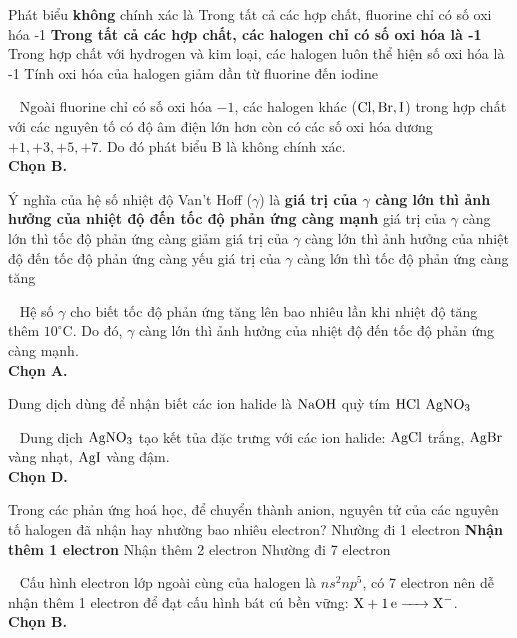 \documentclass[12pt,a4paper]{article}
\renewcommand{\loigiai}[1]{%
  \par\smallskip\noindent{\color{blue!80!black}\textbf{Lời giải:}}\ #1\par\smallskip
}
\renewcommand{\True}{\bfseries\color{red!80!black}}
\begin{document}
\begin{ex}
Phát biểu \textbf{không} chính xác là
\choice
{Trong tất cả các hợp chất, fluorine chỉ có số oxi hóa -1}
{\True Trong tất cả các hợp chất, các halogen chỉ có số oxi hóa là -1}
{Trong hợp chất với hydrogen và kim loại, các halogen luôn thể hiện số oxi hóa là -1}
{Tính oxi hóa của halogen giảm dần từ fluorine đến iodine}
\loigiai{
Ngoài fluorine chỉ có số oxi hóa $-1$, các halogen khác ($\ce{Cl, Br, I}$) trong hợp chất với các nguyên tố có độ âm điện lớn hơn còn có các số oxi hóa dương $+1, +3, +5, +7$. Do đó phát biểu B là không chính xác.\\
\textbf{Chọn B.}
}
\end{ex}

\begin{ex}
Ý nghĩa của hệ số nhiệt độ Van't Hoff ($\gamma$) là
\choice
{\True giá trị của $\gamma$ càng lớn thì ảnh hưởng của nhiệt độ đến tốc độ phản ứng càng mạnh}
{giá trị của $\gamma$ càng lớn thì tốc độ phản ứng càng giảm}
{giá trị của $\gamma$ càng lớn thì ảnh hưởng của nhiệt độ đến tốc độ phản ứng càng yếu}
{giá trị của $\gamma$ càng lớn thì tốc độ phản ứng càng tăng}
\loigiai{
Hệ số $\gamma$ cho biết tốc độ phản ứng tăng lên bao nhiêu lần khi nhiệt độ tăng thêm $10^\circ\text{C}$. Do đó, $\gamma$ càng lớn thì ảnh hưởng của nhiệt độ đến tốc độ phản ứng càng mạnh.\\
\textbf{Chọn A.}
}
\end{ex}

\begin{ex}
Dung dịch dùng để nhận biết các ion halide là
\choice
{$\ce{NaOH}$}
{quỳ tím}
{$\ce{HCl}$}
{\True $\ce{AgNO3}$}
\loigiai{
Dung dịch $\ce{AgNO3}$ tạo kết tủa đặc trưng với các ion halide: $\ce{AgCl}$ trắng, $\ce{AgBr}$ vàng nhạt, $\ce{AgI}$ vàng đậm.\\
\textbf{Chọn D.}
}
\end{ex}

\begin{ex}
Trong các phản ứng hoá học, để chuyển thành anion, nguyên tử của các nguyên tố halogen đã nhận hay nhường bao nhiêu electron?
\choice
{Nhường đi 1 electron}
{\True Nhận thêm 1 electron}
{Nhận thêm 2 electron}
{Nhường đi 7 electron}
\loigiai{
Cấu hình electron lớp ngoài cùng của halogen là $ns^2np^5$, có 7 electron nên dễ nhận thêm 1 electron để đạt cấu hình bát cú bền vững: $\ce{X + 1e -> X-}$.\\
\textbf{Chọn B.}
}
\end{ex}
\end{document}
